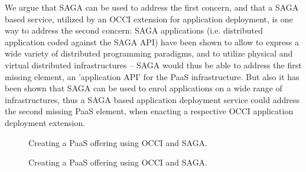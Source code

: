 \documentclass[10pt,conference,final,letterpaper,twoside,twocolumn,]{IEEEtran}
\begin{document}
 We argue that SAGA can be used to address the first concern, and that
 a SAGA based service, utilized by an OCCI extension for application
 deployment, is one way to address the second concern:  SAGA
 applications (i.e. distributed application coded against the SAGA
 API) have been shown to allow to express a wide variety of
 distributed programming paradigms, and to utilize physical and
 virtual distributed infrastructures -- SAGA would thus be able to
 address the first missing element, an 'application API' for the PaaS
 infrastructure.  But also it has been shown that SAGA can be used to
 enrol applications on a wide range of infrastructures, thus a SAGA
 based application deployment service could address the second missing
 PaaS element, when enacting a respective OCCI application deployment
 extension.

 \begin{figure}[htb]
  \caption{\label{fig:arch3} Creating a PaaS offering using OCCI and SAGA.}
 \end{figure}

 \begin{figure}[htb]
  \caption{\label{fig:arch3} Creating a PaaS offering using OCCI and SAGA.}
 \end{figure}
\end{document}

